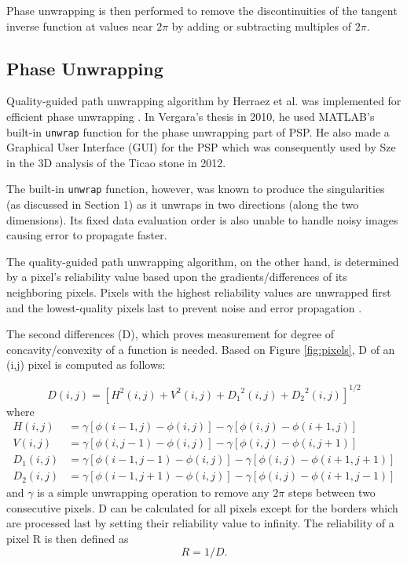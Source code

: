 Phase unwrapping is then performed to remove the discontinuities of the tangent inverse function at values near $2\pi$ by adding or subtracting multiples of $2\pi$.

\subsection{Phase Unwrapping}

Quality-guided path unwrapping algorithm by Herraez et al. was implemented for efficient phase unwrapping \cite{Herraez2002}. 
In Vergara's thesis in 2010, he used MATLAB's built-in \texttt{unwrap} function for the phase unwrapping part of PSP. He also made a Graphical User Interface (GUI) for the PSP which was consequently used by Sze \cite{Sze2012} in the 3D analysis of the Ticao stone in 2012.

The built-in \texttt{unwrap} function, however, was known to produce the singularities (as discussed in Section 1) as it unwraps in two directions (along the two dimensions). 
Its fixed data evaluation order is also unable to handle noisy images causing error to propagate faster.

The quality-guided path unwrapping algorithm, on the other hand, is determined by a pixel's reliability value based upon the gradients/differences of its neighboring pixels. Pixels with the highest reliability values are unwrapped first and the lowest-quality pixels last to prevent noise and error propagation \cite{Herraez2002}.
 
The second differences (D), which proves measurement for degree of concavity/convexity of a function is needed. Based on Figure \ref{fig:pixels}, D of an (i,j) pixel is computed as follows:

\begin{equation}
D(i,j) = {[H^2(i,j)+V^2(i,j) +{D_1}^2(i,j) + {D_2}^2(i,j)]}^{1/2}
\end{equation}
where
\begin{align}
H(i,j) &= \gamma[\phi(i-1,j)-\phi(i,j)]- \gamma[\phi(i,j)-\phi(i+1,j)] \\
V(i,j) &= \gamma[\phi(i,j-1)-\phi(i,j)]- \gamma[\phi(i,j)-\phi(i,j+1)] \\
D_1(i,j) &= \gamma[\phi(i-1,j-1)-\phi(i,j)]- \gamma[\phi(i,j)-\phi(i+1,j+1)] \\
D_2(i,j) &= \gamma[\phi(i-1,j+1)-\phi(i,j)]- \gamma[\phi(i,j)-\phi(i+1,j-1)]
\end{align}
and $\gamma$ is a simple unwrapping operation to remove any $2\pi$ steps between two consecutive pixels. D can be calculated for all pixels except for the borders which are processed last by setting their reliability value to infinity. The reliability of a pixel R is then defined as
\begin{equation}
R = 1/D.
\end{equation}

